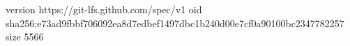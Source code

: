 version https://git-lfs.github.com/spec/v1
oid sha256:e73ad9fbbf706092ea8d7edbef1497dbc1b240d00e7cf0a90100bc2347782257
size 5566
